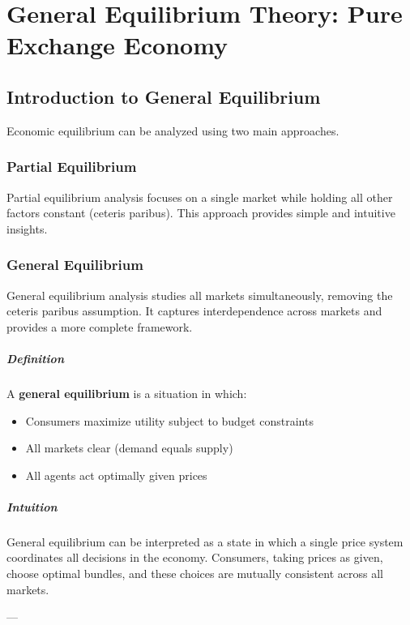\chapter{General Equilibrium Theory: Pure Exchange Economy}

\section{Introduction to General Equilibrium}

Economic equilibrium can be analyzed using two main approaches.

\subsection{Partial Equilibrium}
Partial equilibrium analysis focuses on a single market while holding all other factors constant (ceteris paribus).  
This approach provides simple and intuitive insights.

\subsection{General Equilibrium}
General equilibrium analysis studies all markets simultaneously, removing the ceteris paribus assumption.  
It captures interdependence across markets and provides a more complete framework.

\paragraph{Definition}
A \textbf{general equilibrium} is a situation in which:
\begin{itemize}
    \item Consumers maximize utility subject to budget constraints
    \item All markets clear (demand equals supply)
    \item All agents act optimally given prices
\end{itemize}

\paragraph{Intuition}
General equilibrium can be interpreted as a state in which a single price system
coordinates all decisions in the economy.  
Consumers, taking prices as given, choose optimal bundles, and these choices are
mutually consistent across all markets.

---

